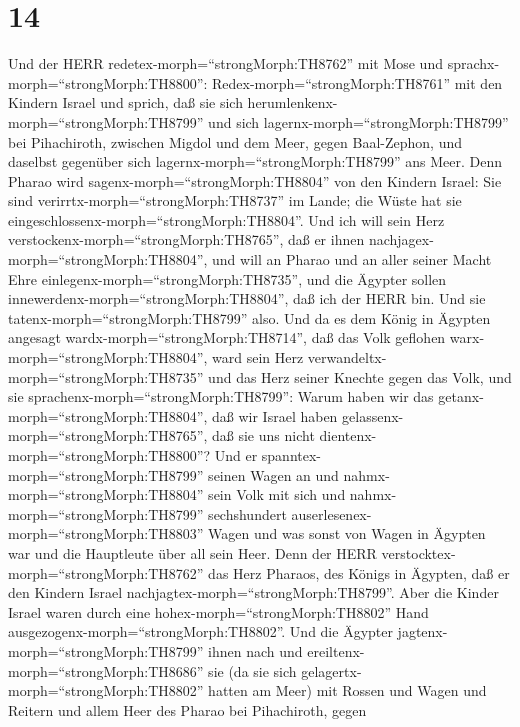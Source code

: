 \hypertarget{section-13}{%
\section{14}\label{section-13}}

 Und der HERR redetex-morph=``strongMorph:TH8762'' mit Mose
und sprachx-morph=``strongMorph:TH8800'': 
Redex-morph=``strongMorph:TH8761'' mit den Kindern Israel und sprich,
daß sie sich herumlenkenx-morph=``strongMorph:TH8799'' und sich
lagernx-morph=``strongMorph:TH8799'' bei Pihachiroth, zwischen Migdol
und dem Meer, gegen Baal-Zephon, und daselbst gegenüber sich
lagernx-morph=``strongMorph:TH8799'' ans Meer.  Denn Pharao
wird sagenx-morph=``strongMorph:TH8804'' von den Kindern Israel: Sie
sind verirrtx-morph=``strongMorph:TH8737'' im Lande; die Wüste hat sie
eingeschlossenx-morph=``strongMorph:TH8804''.  Und ich will
sein Herz verstockenx-morph=``strongMorph:TH8765'', daß er ihnen
nachjagex-morph=``strongMorph:TH8804'', und will an Pharao und an aller
seiner Macht Ehre einlegenx-morph=``strongMorph:TH8735'', und die
Ägypter sollen innewerdenx-morph=``strongMorph:TH8804'', daß ich der
HERR bin. Und sie tatenx-morph=``strongMorph:TH8799'' also. 
Und da es dem König in Ägypten angesagt
wardx-morph=``strongMorph:TH8714'', daß das Volk geflohen
warx-morph=``strongMorph:TH8804'', ward sein Herz
verwandeltx-morph=``strongMorph:TH8735'' und das Herz seiner Knechte
gegen das Volk, und sie sprachenx-morph=``strongMorph:TH8799'': Warum
haben wir das getanx-morph=``strongMorph:TH8804'', daß wir Israel haben
gelassenx-morph=``strongMorph:TH8765'', daß sie uns nicht
dientenx-morph=``strongMorph:TH8800''?  Und er
spanntex-morph=``strongMorph:TH8799'' seinen Wagen an und
nahmx-morph=``strongMorph:TH8804'' sein Volk mit sich  und
nahmx-morph=``strongMorph:TH8799'' sechshundert
auserlesenex-morph=``strongMorph:TH8803'' Wagen und was sonst von Wagen
in Ägypten war und die Hauptleute über all sein Heer.  Denn
der HERR verstocktex-morph=``strongMorph:TH8762'' das Herz Pharaos, des
Königs in Ägypten, daß er den Kindern Israel
nachjagtex-morph=``strongMorph:TH8799''. Aber die Kinder Israel waren
durch eine hohex-morph=``strongMorph:TH8802'' Hand
ausgezogenx-morph=``strongMorph:TH8802''.  Und die Ägypter
jagtenx-morph=``strongMorph:TH8799'' ihnen nach und
ereiltenx-morph=``strongMorph:TH8686'' sie (da sie sich
gelagertx-morph=``strongMorph:TH8802'' hatten am Meer) mit Rossen und
Wagen und Reitern und allem Heer des Pharao bei Pihachiroth, gegen
